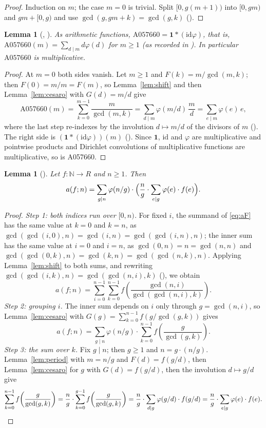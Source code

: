 \documentclass[11pt]{amsart}
\theoremstyle{plain}
\newtheorem{lemma}[theorem]{Lemma}
\theoremstyle{definition}
\newcommand{\N}{\mathbb{N}}
\newcommand{\idf}{\mathrm{id}}
\newcommand{\A}[1]{\mathrm{A#1}}
\begin{document}
\begin{proof}
Induction on $m$; the case $m=0$ is trivial. Split $[0,g(m+1))$ into $[0,gm)$ and $gm+[0,g)$ and use $\gcd(g,gm+k)=\gcd(g,k)$ ().
\end{proof}

\begin{lemma}[, ]\label{lem:A057660}
As arithmetic functions, $\A{057660}=\mathbf 1*(\idf\varphi)$, that is, $\A{057660}(m)=\sum_{d\mid m}d\varphi(d)$ for $m\ge1$ (as recorded in \cite{A057660}). In particular $\A{057660}$ is multiplicative.
\end{lemma}

\begin{proof}
At $m=0$ both sides vanish. Let $m\ge1$ and $F(k)=m/\gcd(m,k)$; then $F(0)=m/m=F(m)$, so Lemma~\ref{lem:shift} and then Lemma~\ref{lem:cesaro} with $G(d)=m/d$ give
\[ \A{057660}(m)=\sum_{k=0}^{m-1}\frac{m}{\gcd(m,k)}=\sum_{d\mid m}\varphi(m/d)\,\frac md=\sum_{e\mid m}\varphi(e)\,e, \]
where the last step re-indexes by the involution $d\mapsto m/d$ of the divisors of $m$ (). The right side is $(\mathbf 1*(\idf\varphi))(m)$ (). Since $\mathbf 1$, $\idf$ and $\varphi$ are multiplicative and pointwise products and Dirichlet convolutions of multiplicative functions are multiplicative, so is A057660.
\end{proof}

\begin{lemma}[]\label{lem:core}
Let $f\colon\N\to R$ and $n\ge1$. Then
\[ a(f;n)=\sum_{g\mid n}\varphi(n/g)\cdot\Bigl(\frac ng\cdot\sum_{e\mid g}\varphi(e)\cdot f(e)\Bigr). \]
\end{lemma}

\begin{proof}
\emph{Step 1: both indices run over $[0,n)$.} For fixed $i$, the summand of \eqref{eq:aF} has the same value at $k=0$ and $k=n$, as $\gcd(\gcd(i,0),n)=\gcd(i,n)=\gcd(\gcd(i,n),n)$; the inner sum has the same value at $i=0$ and $i=n$, as $\gcd(0,n)=n=\gcd(n,n)$ and $\gcd(\gcd(0,k),n)=\gcd(k,n)=\gcd(\gcd(n,k),n)$. Applying Lemma~\ref{lem:shift} to both sums, and rewriting $\gcd(\gcd(i,k),n)=\gcd(\gcd(n,i),k)$ (), we obtain
\[ a(f;n)=\sum_{i=0}^{n-1}\sum_{k=0}^{n-1}f\!\left(\frac{\gcd(n,i)}{\gcd(\gcd(n,i),k)}\right). \]
\emph{Step 2: grouping $i$.} The inner sum depends on $i$ only through $g=\gcd(n,i)$, so Lemma~\ref{lem:cesaro} with $G(g)=\sum_{k=0}^{n-1}f(g/\gcd(g,k))$ gives
\[ a(f;n)=\sum_{g\mid n}\varphi(n/g)\cdot\sum_{k=0}^{n-1}f\!\left(\frac{g}{\gcd(g,k)}\right). \]
\emph{Step 3: the sum over $k$.} Fix $g\mid n$; then $g\ge1$ and $n=g\cdot(n/g)$. Lemma~\ref{lem:period} with $m=n/g$ and $F(d)=f(g/d)$, then Lemma~\ref{lem:cesaro} for $g$ with $G(d)=f(g/d)$, then the involution $d\mapsto g/d$ give
\[ \sum_{k=0}^{n-1}f\!\left(\frac{g}{\gcd(g,k)}\right)=\frac ng\cdot\sum_{k=0}^{g-1}f\!\left(\frac{g}{\gcd(g,k)}\right)=\frac ng\cdot\sum_{d\mid g}\varphi(g/d)\cdot f(g/d)=\frac ng\cdot\sum_{e\mid g}\varphi(e)\cdot f(e).\qedhere \]
\end{proof}
\end{document}
